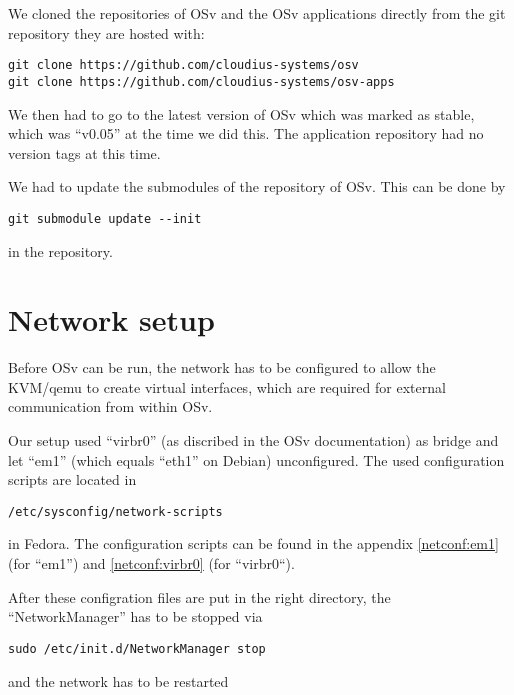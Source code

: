         We cloned the repositories of OSv and the OSv applications directly from
        the git repository they are hosted with:

\begin{lstlisting}
git clone https://github.com/cloudius-systems/osv
git clone https://github.com/cloudius-systems/osv-apps
\end{lstlisting}

        We then had to go to the latest version of OSv which was marked as
        stable, which was ``v0.05'' at the time we did this. The application
        repository had no version tags at this time.

        We had to update the submodules of the repository of OSv. This can be
        done by

\begin{lstlisting}
git submodule update --init
\end{lstlisting}

        in the repository.

    \section{Network setup}

        Before OSv can be run, the network has to be configured to allow the
        KVM/qemu to create virtual interfaces, which are required for external
        communication from within OSv.

        Our setup used ``virbr0'' (as discribed in the OSv documentation) as
        bridge and let ``em1'' (which equals ``eth1'' on Debian) unconfigured.
        The used configuration scripts are located in

\begin{lstlisting}
/etc/sysconfig/network-scripts
\end{lstlisting}

        in Fedora. The configuration scripts can be found in the appendix
        \ref{netconf:em1} (for ``em1'') and \ref{netconf:virbr0} (for
        ``virbr0``).

        After these configration files are put in the right directory, the
        ``NetworkManager'' has to be stopped via

\begin{lstlisting}
sudo /etc/init.d/NetworkManager stop
\end{lstlisting}

        and the network has to be restarted

